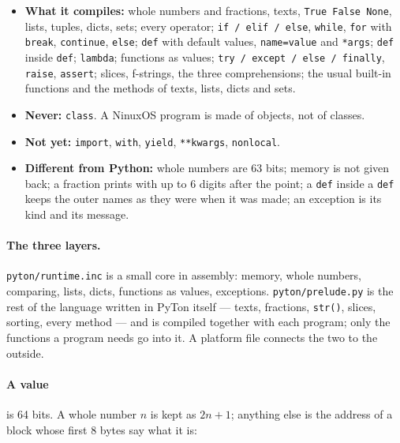 \documentclass[11pt,a4paper]{article}
\newcommand{\file}[1]{\texttt{#1}}
\begin{document}
\begin{itemize}
\item \textbf{What it compiles:} whole numbers and fractions, texts, \texttt{True False None},
      lists, tuples, dicts, sets; every operator; \texttt{if / elif / else}, \texttt{while},
      \texttt{for} with \texttt{break}, \texttt{continue}, \texttt{else}; \texttt{def} with default
      values, \texttt{name=value} and \texttt{*args}; \texttt{def} inside \texttt{def}; \texttt{lambda};
      functions as values; \texttt{try / except / else / finally}, \texttt{raise}, \texttt{assert};
      slices, f-strings, the three comprehensions; the usual built-in functions and the methods of
      texts, lists, dicts and sets.
\item \textbf{Never:} \texttt{class}. A NinuxOS program is made of objects, not of classes.
\item \textbf{Not yet:} \texttt{import}, \texttt{with}, \texttt{yield}, \texttt{**kwargs},
      \texttt{nonlocal}.
\item \textbf{Different from Python:} whole numbers are 63 bits; memory is not given back; a fraction
      prints with up to 6 digits after the point; a \texttt{def} inside a \texttt{def} keeps the outer
      names as they were when it was made; an exception is its kind and its message.
\end{itemize}

\paragraph{The three layers.}
\file{pyton/runtime.inc} is a small core in assembly: memory, whole numbers, comparing, lists,
dicts, functions as values, exceptions. \file{pyton/prelude.py} is the rest of the language written
in PyTon itself --- texts, fractions, \texttt{str()}, slices, sorting, every method --- and is
compiled together with each program; only the functions a program needs go into it. A platform
file connects the two to the outside.

\paragraph{A value} is 64 bits. A whole number $n$ is kept as $2n+1$; anything else is the address
of a block whose first 8 bytes say what it is:
\end{document}
